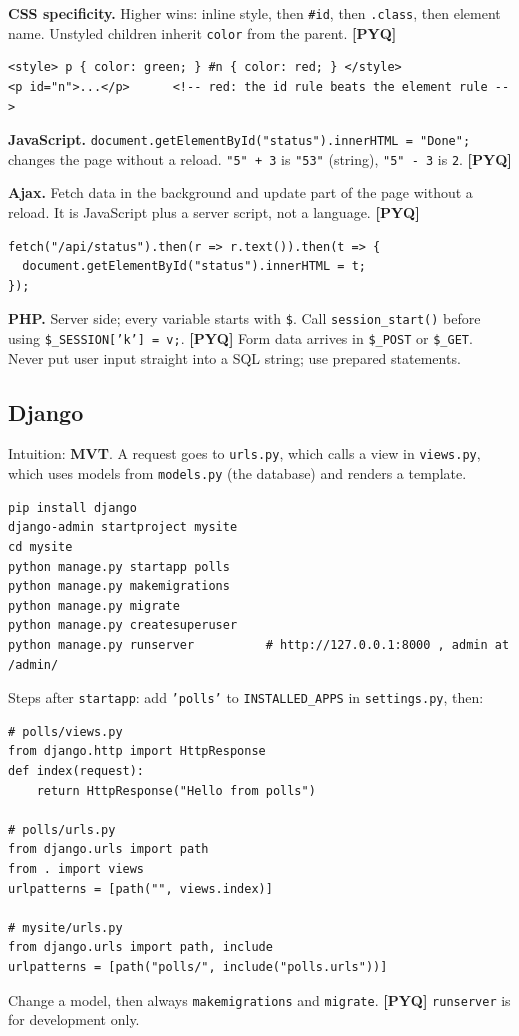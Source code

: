 \documentclass[11pt,a4paper]{article}
\newcommand{\pyq}{\textcolor{ember}{\scriptsize\textbf{[PYQ]}}}
\begin{document}
\textbf{CSS specificity.} Higher wins: inline style, then \texttt{\#id}, then \texttt{.class}, then element name. Unstyled children inherit \texttt{color} from the parent. \pyq{}

\begin{lstlisting}
<style> p { color: green; } #n { color: red; } </style>
<p id="n">...</p>      <!-- red: the id rule beats the element rule -->
\end{lstlisting}
\textbf{JavaScript.} \texttt{document.getElementById("status").innerHTML = "Done";} changes the page without a reload. \texttt{"5" + 3} is \texttt{"53"} (string), \texttt{"5" - 3} is \texttt{2}. \pyq{}

\textbf{Ajax.} Fetch data in the background and update part of the page without a reload. It is JavaScript plus a server script, not a language. \pyq{}

\begin{lstlisting}
fetch("/api/status").then(r => r.text()).then(t => {
  document.getElementById("status").innerHTML = t;
});
\end{lstlisting}
\textbf{PHP.} Server side; every variable starts with \texttt{\$}. Call \texttt{session\_start()} before using \texttt{\$\_SESSION['k'] = v;}. \pyq{} Form data arrives in \texttt{\$\_POST} or \texttt{\$\_GET}. Never put user input straight into a SQL string; use prepared statements.

\subsection{Django}
Intuition: \textbf{MVT}. A request goes to \texttt{urls.py}, which calls a view in \texttt{views.py}, which uses models from \texttt{models.py} (the database) and renders a template.

\begin{lstlisting}
pip install django
django-admin startproject mysite
cd mysite
python manage.py startapp polls
python manage.py makemigrations
python manage.py migrate
python manage.py createsuperuser
python manage.py runserver          # http://127.0.0.1:8000 , admin at /admin/
\end{lstlisting}
Steps after \texttt{startapp}: add \texttt{'polls'} to \texttt{INSTALLED\_APPS} in \texttt{settings.py}, then:

\begin{lstlisting}
# polls/views.py
from django.http import HttpResponse
def index(request):
    return HttpResponse("Hello from polls")

# polls/urls.py
from django.urls import path
from . import views
urlpatterns = [path("", views.index)]

# mysite/urls.py
from django.urls import path, include
urlpatterns = [path("polls/", include("polls.urls"))]
\end{lstlisting}
Change a model, then always \texttt{makemigrations} and \texttt{migrate}. \pyq{} \texttt{runserver} is for development only.
\end{document}
